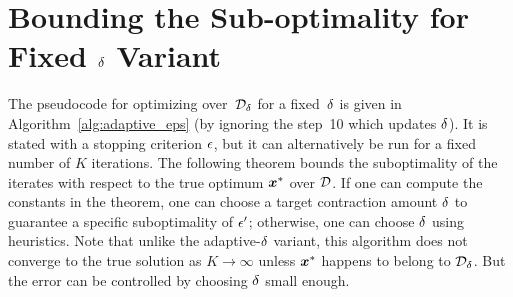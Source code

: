 \section{Bounding the Sub-optimality for Fixed $\delta$ \label{sec:theory_fixed_eps} Variant}
The pseudocode for optimizing over~$\mathcal{D}_{\delta}$ for a fixed~$\delta$ is given in Algorithm~\ref{alg:adaptive_eps} (by ignoring the step~10 which updates $\delta$).
It is stated with a stopping criterion $\epsilon$, but it can alternatively
be run for a fixed number of $K$ iterations.
The following theorem bounds the suboptimality of the iterates with respect to the 
true optimum $\bm{x}^*$ over $\mathcal{D}$. If one can compute the constants in the theorem,
one can choose a target contraction amount $\delta$ to guarantee
a specific suboptimality of $\epsilon'$; otherwise, one can choose $\delta$
using heuristics. Note that unlike the adaptive-$\delta$ variant, this algorithm
does not converge to the true solution as $K \rightarrow \infty$ unless $\bm{x}^*$ happens
to belong to $\mathcal{D}_{\delta}$. But the error can be controlled by choosing $\delta$ small enough.

%
%
%
%
%
%
%
%
%
%
%
%
%
%
%
%
%
%
%
%
%
%

